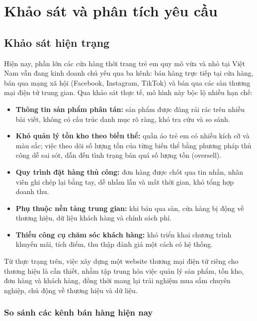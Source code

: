 \chapter{Khảo sát và phân tích yêu cầu}
\label{ch:req}

\section{Khảo sát hiện trạng}

Hiện nay, phần lớn các cửa hàng thời trang trẻ em quy mô vừa và nhỏ tại Việt Nam vẫn đang
kinh doanh chủ yếu qua ba kênh: bán hàng trực tiếp tại cửa hàng, bán qua mạng xã hội
(Facebook, Instagram, TikTok) và bán qua các sàn thương mại điện tử trung gian. Qua khảo sát
thực tế, mô hình này bộc lộ nhiều hạn chế:

\begin{itemize}
  \item \textbf{Thông tin sản phẩm phân tán:} sản phẩm được đăng rải rác trên nhiều bài viết,
  không có cấu trúc danh mục rõ ràng, khó tra cứu và so sánh.
  \item \textbf{Khó quản lý tồn kho theo biến thể:} quần áo trẻ em có nhiều kích cỡ và màu sắc;
  việc theo dõi số lượng tồn của từng biến thể bằng phương pháp thủ công dễ sai sót, dẫn đến tình
  trạng bán quá số lượng tồn (oversell).
  \item \textbf{Quy trình đặt hàng thủ công:} đơn hàng được chốt qua tin nhắn, nhân viên ghi
  chép lại bằng tay, dễ nhầm lẫn và mất thời gian, khó tổng hợp doanh thu.
  \item \textbf{Phụ thuộc nền tảng trung gian:} khi bán qua sàn, cửa hàng bị động về thương hiệu,
  dữ liệu khách hàng và chính sách phí.
  \item \textbf{Thiếu công cụ chăm sóc khách hàng:} khó triển khai chương trình khuyến mãi, tích
  điểm, thu thập đánh giá một cách có hệ thống.
\end{itemize}

Từ thực trạng trên, việc xây dựng một website thương mại điện tử riêng cho thương hiệu
\brandName{} là cần thiết, nhằm tập trung hóa việc quản lý sản phẩm, tồn kho, đơn hàng và
khách hàng, đồng thời mang lại trải nghiệm mua sắm chuyên nghiệp, chủ động về thương hiệu và
dữ liệu.

\subsection{So sánh các kênh bán hàng hiện nay}

